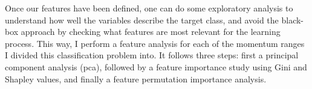 Once our features have been defined, one can do some exploratory analysis to understand how well the variables describe the target class, and avoid the black-box approach by checking what features are most relevant for the learning process. This way, I perform a feature analysis for each of the momentum ranges I divided this classification problem into. It follows three steps: first a principal component analysis (\gls{pca}), followed by a feature importance study using Gini and Shapley values, and finally a feature permutation importance analysis.

